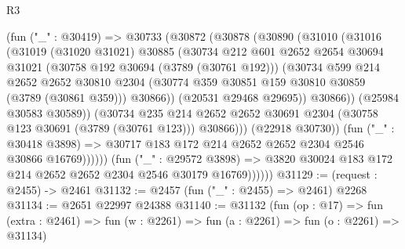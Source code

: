 \begin{lexlean}{R3}
\begin{coremodule}
                        (fun ("_" : @30419) =>
                        @30733
                          (@30872
                            (@30878
                              (@30890
                                (@31010
                                  (@31016
                                    (@31019
                                      (@31020 @31021)
                                      @30885
                                      (@30734
                                        @212
                                        @601
                                        @2652
                                        @2654
                                        @30694
                                        @31021
                                        (@30758 @192 @30694 (@3789 (@30761 @192)))
                                        (@30734
                                          @599
                                          @214
                                          @2652
                                          @2652
                                          @30810
                                          @2304
                                          (@30774
                                            @359
                                            @30851
                                            @159
                                            @30810
                                            @30859
                                            (@3789 (@30861 @359)))
                                          @30866))
                                      (@20531 @29468 @29695))
                                    @30866))
                                (@25984 @30583 @30589))
                              (@30734
                                @235
                                @214
                                @2652
                                @2652
                                @30691
                                @2304
                                (@30758 @123 @30691 (@3789 (@30761 @123)))
                                @30866)))
                          (@22918 @30730))
                        (fun ("_" : @30418 @3898) =>
                        @30717 @183 @172 @214 @2652 @2652 @2304 @2546 @30866 @16769))))))
              (fun ("_" : @29572 @3898) =>
              @3820 @30024 @183 @172 @214 @2652 @2652 @2304 @2546 @30179 @16769))))))
@31129 := (request : @2455) -> @2461
@31132 := @2457 (fun ("_" : @2455) => @2461) @2268
@31134 := @2651 @22997 @24388
@31140 := @31132
    (fun (op : @17) =>
    fun (extra : @2461) => fun (w : @2261) => fun (a : @2261) => fun (o : @2261) => @31134)

\end{coremodule}
\end{lexlean}
